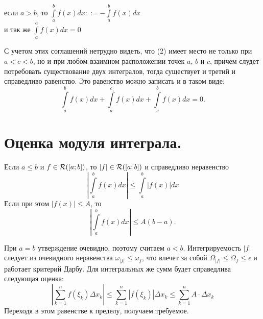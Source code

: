 \begin{center}
	если $a > b$, то $\int\limits_a^b f(x)dx ::= -\int\limits^b_a f(x)dx$\\
	и так же $\int\limits_a^a f(x)dx = 0$
\end{center}
С учетом этих соглашений нетрудно видеть, что (2) имеет место не только при $a < c <b$, но и при любом взаимном расположении точек $a$, $b$ и $c$, причем слудет потребовать существование двух интегралов, тогда существует и третий и справедливо равенство. Это равенство можно записать и в таком виде:
$$\int\limits_a^b f(x)dx + \int\limits_a^c f(x)dx + \int\limits_c^b f(x)dx = 0.$$
\section{Оценка модуля интеграла.}
\begin{theorem}
	Если $a \leq b$ и $f \in\mathcal{R}([a; b])$, то $\left|f\right| \in\mathcal{R}([a; b])$ и справедливо неравенство $$\left| \int\limits_a^b f(x)dx \right|  \leq \int\limits_a^b \left| f(x) \right| dx$$
	Если при этом $\left| f(x) \right| \leq A$, то $$\left| \int\limits_a^b f(x)dx \right| \leq A(b-a).$$
\end{theorem}
\begin{Proof}
	При $a=b$ утверждение очевидно, поэтому считаем $a<b$. Интегрируемость $\left| f \right|$ следует из очевидного неравенства $\omega_{\left| f \right|} \leq \omega_f$, что влечет за собой $\Omega_{\left| f \right|} \leq \Omega_f \leq \epsilon$ и работает критерий Дарбу. Для интегральных же сумм будет справедлива следующая оценка:
	$$\left| \sum_{k=1}^n f(\xi_k)\Delta x_k \right| \leq \sum_{k=1}^n \left| f(\xi_k) \right| \Delta x_k \leq \sum_{k=1}^n A\cdot \Delta x_k$$
	Переходя в этом равенстве к пределу, получаем требуемое.
\end{Proof}
